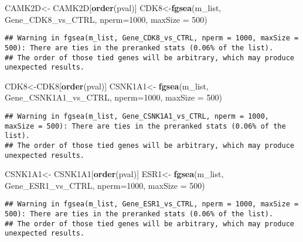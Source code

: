 \documentclass[]{article}
\newenvironment{Shaded}{\begin{snugshade}}{\end{snugshade}}
\newcommand{\KeywordTok}[1]{\textcolor[rgb]{0.13,0.29,0.53}{\textbf{#1}}}
\newcommand{\DataTypeTok}[1]{\textcolor[rgb]{0.13,0.29,0.53}{#1}}
\newcommand{\DecValTok}[1]{\textcolor[rgb]{0.00,0.00,0.81}{#1}}
\newcommand{\StringTok}[1]{\textcolor[rgb]{0.31,0.60,0.02}{#1}}
\newcommand{\NormalTok}[1]{#1}
\begin{document}
\begin{Shaded}
\begin{Highlighting}[]
\NormalTok{CAMK2D<-}\StringTok{ }\NormalTok{CAMK2D[}\KeywordTok{order}\NormalTok{(pval)]}
\NormalTok{CDK8<-}\KeywordTok{fgsea}\NormalTok{(m_list, Gene_CDK8_vs_CTRL, }\DataTypeTok{nperm=}\DecValTok{1000}\NormalTok{, }\DataTypeTok{maxSize =} \DecValTok{500}\NormalTok{)}
\end{Highlighting}
\end{Shaded}

\begin{verbatim}
## Warning in fgsea(m_list, Gene_CDK8_vs_CTRL, nperm = 1000, maxSize = 500): There are ties in the preranked stats (0.06% of the list).
## The order of those tied genes will be arbitrary, which may produce unexpected results.
\end{verbatim}

\begin{Shaded}
\begin{Highlighting}[]
\NormalTok{CDK8<-CDK8[}\KeywordTok{order}\NormalTok{(pval)]}
\NormalTok{CSNK1A1<-}\StringTok{ }\KeywordTok{fgsea}\NormalTok{(m_list, Gene_CSNK1A1_vs_CTRL, }\DataTypeTok{nperm=}\DecValTok{1000}\NormalTok{, }\DataTypeTok{maxSize =} \DecValTok{500}\NormalTok{)}
\end{Highlighting}
\end{Shaded}

\begin{verbatim}
## Warning in fgsea(m_list, Gene_CSNK1A1_vs_CTRL, nperm = 1000, maxSize = 500): There are ties in the preranked stats (0.06% of the list).
## The order of those tied genes will be arbitrary, which may produce unexpected results.
\end{verbatim}

\begin{Shaded}
\begin{Highlighting}[]
\NormalTok{CSNK1A1<-}\StringTok{ }\NormalTok{CSNK1A1[}\KeywordTok{order}\NormalTok{(pval)]}
\NormalTok{ESR1<-}\StringTok{ }\KeywordTok{fgsea}\NormalTok{(m_list, Gene_ESR1_vs_CTRL, }\DataTypeTok{nperm=}\DecValTok{1000}\NormalTok{, }\DataTypeTok{maxSize =} \DecValTok{500}\NormalTok{)}
\end{Highlighting}
\end{Shaded}

\begin{verbatim}
## Warning in fgsea(m_list, Gene_ESR1_vs_CTRL, nperm = 1000, maxSize = 500): There are ties in the preranked stats (0.06% of the list).
## The order of those tied genes will be arbitrary, which may produce unexpected results.
\end{verbatim}
\end{document}
